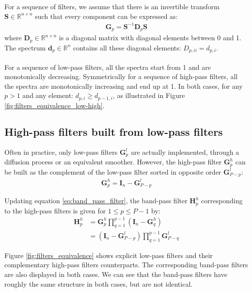 \documentclass[12pt]{scrartcl}
\begin{document}
For a sequence of filters, we assume that there is an invertible transform $\mathbf{S} \in \mathbb{R}^{n \times n}$ such that every component can be expressed as:
\begin{align}
\mathbf{G}_p = \mathbf{S}^{-1} \mathbf{D}_p \mathbf{S}
\end{align}
where $\mathbf{D}_p \in \mathbb{R}^{n \times n}$ is a diagonal matrix with diagonal elements between 0 and 1. The spectrum $\mathbf{d}_p \in \mathbb{R}^n$ contains all these diagonal elements: $D_{p,ii} = d_{p,i}$.\\
$  $\\
For a sequence of low-pass filters, all the spectra start from 1 and are monotonically decreasing. Symmetrically for a sequence of high-pass filters, all the spectra are monotonically increasing and end up at 1. In both cases, for any $p > 1$ and any element: $d_{p,i} \ge d_{p-1,i}$, as illustrated in Figure \ref{fig:filters_equivalence_low-high}.

\subsection{High-pass filters built from low-pass filters}
Often in practice, only low-pass filters $\mathbf{G}^l_p$ are actually implemented, through a diffusion process or an equivalent smoother. However, the high-pass filter $\mathbf{G}^h_p$ can be built as the complement of the low-pass filter sorted in opposite order $\mathbf{G}^l_{P-p}$:
\begin{align}
\mathbf{G}^h_p = \mathbf{I}_n - \mathbf{G}^l_{P-p}
\end{align}

Updating equation \eqref{eq:band_pass_filter}, the band-pass filter $\mathbf{H}^h_p$ corresponding to the high-pass filters is given for $1 \le p \le P-1$ by:
\begin{align}
\label{eq:band_pass_filter_hp}
\mathbf{H}^h_p & = \mathbf{G}^h_p \prod_{q=1}^{p-1} \left(\mathbf{I}_n - \mathbf{G}^h_q\right) \nonumber \\
& = \left(\mathbf{I}_n - \mathbf{G}^l_{P-p}\right) \prod_{q=1}^{p-1} \mathbf{G}^l_{P-q}
\end{align}

Figure \ref{fig:filters_equivalence} shows explicit low-pass filters and their complementary high-pass filters counterparts. The corresponding band-pass filters are also displayed in both cases. We can see that the band-pass filters have roughly the same structure in both cases, but are not identical.
\end{document}
